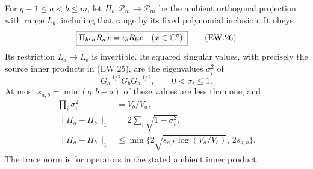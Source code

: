 \begin{theorem}
For $q-1\le a<b\le m$, let
$\Pi_b:\mathcal P_m\to\mathcal P_m$ be the ambient orthogonal
projection with range $L_b$, including that range by its fixed
polynomial inclusion. It obeys
\[
 \boxed{\Pi_b\iota_aR_ax=\iota_bR_bx\quad(x\in\mathbb C^q).}       \tag{EW.26}
\]
Its restriction $L_a\to L_b$ is invertible. Its squared singular
values, with precisely the source inner products in (EW.25), are
the eigenvalues $\sigma_i^2$ of
\[
 G_a^{-1/2}G_bG_a^{-1/2},\qquad0<\sigma_i\le1.
                                                               \tag{EW.27}
\]
At most $s_{a,b}=\min(q,b-a)$ of these values are less than one,
and
\[
 \begin{split}
 \prod_i\sigma_i^2&=V_b/V_a,\\
 \|\Pi_a-\Pi_b\|_1
 &=2\sum_i\sqrt{1-\sigma_i^2},\\
 \|\Pi_a-\Pi_b\|_1
 &\le\min\{2\sqrt{s_{a,b}\log(V_a/V_b)},\,2s_{a,b}\}.
 \end{split}                                                   \tag{EW.28}
\]
The trace norm is for operators in the stated ambient inner product.
\end{theorem}
